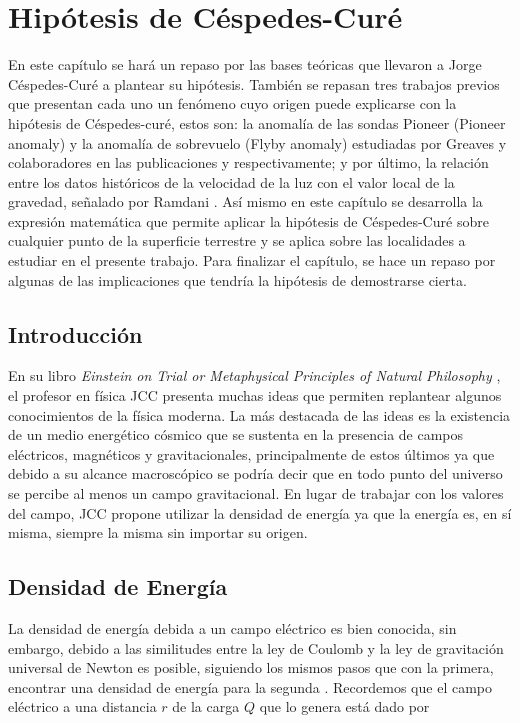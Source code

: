 \chapter{Hipótesis de Céspedes-Curé}

En este capítulo se hará un repaso por las bases teóricas que llevaron a Jorge Céspedes-Curé a plantear su hipótesis.  También se repasan tres trabajos previos que presentan cada uno un fenómeno cuyo origen puede explicarse con la hipótesis de Céspedes-curé, estos son: la anomalía de las sondas Pioneer (Pioneer anomaly) y la anomalía de sobrevuelo (Flyby anomaly) estudiadas por Greaves y colaboradores en las publicaciones \cite{Cisnotconstant} y \cite{Greavesflyby} respectivamente; y por último, la relación entre los datos históricos de la velocidad de la luz con el valor local de la gravedad, señalado por Ramdani \cite{ramdani}. Así mismo en este capítulo se desarrolla la expresión matemática que permite aplicar la hipótesis de Céspedes-Curé sobre cualquier punto de la superficie terrestre y se aplica sobre las localidades a estudiar en el presente trabajo. Para finalizar el capítulo, se hace un repaso por algunas de las implicaciones que tendría la hipótesis de demostrarse cierta.

\section{Introducción}
En su libro \textit{Einstein on Trial or Metaphysical Principles of Natural Philosophy} \cite{bib:el-libro}, el profesor en física \ac{JCC} presenta muchas ideas que permiten replantear algunos conocimientos de la física moderna. La más destacada de las ideas es la existencia de un medio energético cósmico que se sustenta en la presencia de campos eléctricos, magnéticos y gravitacionales, principalmente de estos últimos ya que debido a su alcance macroscópico se podría decir que en todo punto del universo se percibe al menos un campo gravitacional. En lugar de trabajar con los valores del campo, \ac{JCC} propone utilizar la densidad de energía ya que la energía es, en sí misma, siempre la misma sin importar su origen. 

\section{Densidad de Energía}
La densidad de energía debida a un campo eléctrico es bien conocida, sin embargo, debido a las similitudes entre la ley de Coulomb y la ley de gravitación universal de Newton es posible, siguiendo los mismos pasos que con la primera, encontrar una densidad de energía para la segunda \cite{NASACalculo}. Recordemos que el campo eléctrico a una distancia $r$ de la carga $Q$ que lo genera está dado por


